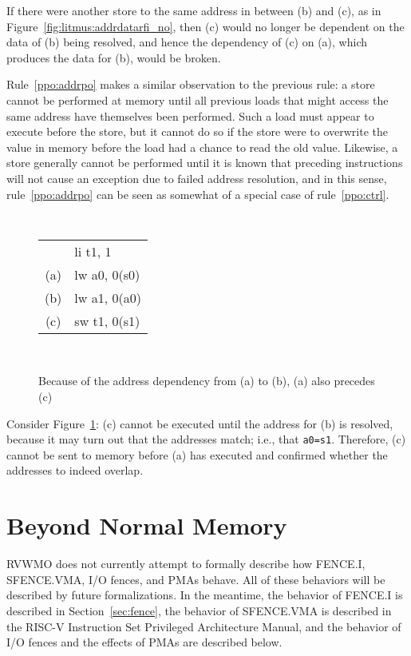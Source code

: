 If there were another store to the same address in between (b) and (c), as in Figure~\ref{fig:litmus:addrdatarfi_no}, then (c) would no longer be dependent on the data of (b) being resolved, and hence the dependency of (c) on (a), which produces the data for (b), would be broken.

Rule~\ref{ppo:addrpo} makes a similar observation to the previous rule: a store cannot be performed at memory until all previous loads that might access the same address have themselves been performed.
Such a load must appear to execute before the store, but it cannot do so if the store were to overwrite the value in memory before the load had a chance to read the old value.
Likewise, a store generally cannot be performed until it is known that preceding instructions will not cause an exception due to failed address resolution, and in this sense, rule~\ref{ppo:addrpo} can be seen as somewhat of a special case of rule~\ref{ppo:ctrl}.

\begin{figure}[h!]
  \centering
  {
    \tt\small
    \begin{tabular}{cl}
        & li t1, 1       \\
    (a) & lw a0, 0(s0)   \\
    (b) & lw a1, 0(a0)   \\
    (c) & sw t1, 0(s1)   \\
    \end{tabular}
  }
  ~~~~
  \diagram
  \caption{Because of the address dependency from (a) to (b), (a) also precedes (c)}
  \label{fig:litmus:addrpo}
\end{figure}

Consider Figure~\ref{fig:litmus:addrpo}:
(c) cannot be executed until the address for (b) is resolved, because it may turn out that the addresses match; i.e., that {\tt a0=s1}.  Therefore, (c) cannot be sent to memory before (a) has executed and confirmed whether the addresses to indeed overlap.


\section{Beyond Normal Memory}

RVWMO does not currently attempt to formally describe how FENCE.I, SFENCE.VMA, I/O fences, and PMAs behave.
All of these behaviors will be described by future formalizations.
In the meantime, the behavior of FENCE.I is described in Section~\ref{sec:fence}, the behavior of SFENCE.VMA is described in the RISC-V Instruction Set Privileged Architecture Manual, and the behavior of I/O fences and the effects of PMAs are described below.


